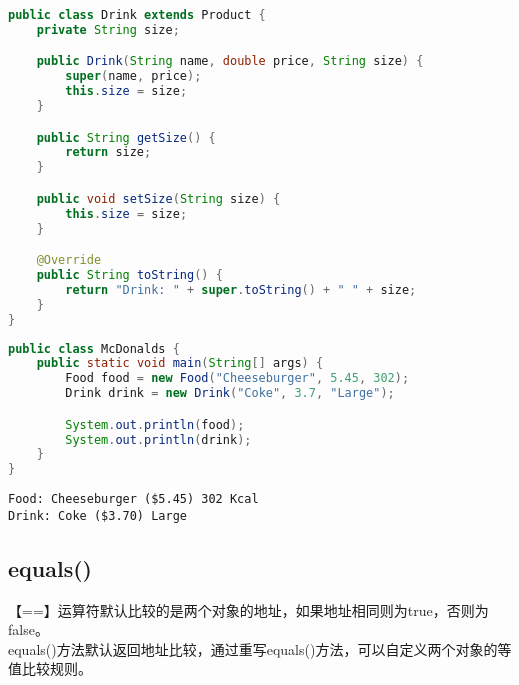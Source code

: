 \begin{lstlisting}[language=Java]
public class Drink extends Product {
    private String size;

    public Drink(String name, double price, String size) {
        super(name, price);
        this.size = size;
    }

    public String getSize() {
        return size;
    }

    public void setSize(String size) {
        this.size = size;
    }

    @Override
    public String toString() {
        return "Drink: " + super.toString() + " " + size;
    }
}
\end{lstlisting}

\begin{lstlisting}[language=Java]
public class McDonalds {
    public static void main(String[] args) {
        Food food = new Food("Cheeseburger", 5.45, 302);
        Drink drink = new Drink("Coke", 3.7, "Large");

        System.out.println(food);
        System.out.println(drink);
    }
}
\end{lstlisting}

\begin{tcolorbox}
	\begin{verbatim}
Food: Cheeseburger ($5.45) 302 Kcal
Drink: Coke ($3.70) Large
	\end{verbatim}
\end{tcolorbox}

\vspace{0.5cm}

\subsection{equals()}

【==】运算符默认比较的是两个对象的地址，如果地址相同则为true，否则为false。\\

equals()方法默认返回地址比较，通过重写equals()方法，可以自定义两个对象的等值比较规则。\\


